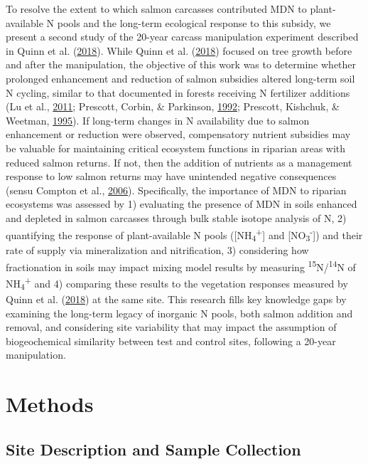 \documentclass [11pt, proquest] {uwthesis}[2015/03/03]
\begin{document}
To resolve the extent to which salmon carcasses contributed MDN to
plant-available N pools and the long-term ecological response to this
subsidy, we present a second study of the 20-year carcass manipulation
experiment described in Quinn et al.
(\protect\hyperlink{ref-Quinn2018}{2018}). While Quinn et al.
(\protect\hyperlink{ref-Quinn2018}{2018}) focused on tree growth before
and after the manipulation, the objective of this work was to determine
whether prolonged enhancement and reduction of salmon subsidies altered
long-term soil N cycling, similar to that documented in forests
receiving N fertilizer additions (Lu et al.,
\protect\hyperlink{ref-Lu2011}{2011}; Prescott, Corbin, \& Parkinson,
\protect\hyperlink{ref-Prescott1992}{1992}; Prescott, Kishchuk, \&
Weetman, \protect\hyperlink{ref-Prescott1995}{1995}). If long-term
changes in N availability due to salmon enhancement or reduction were
observed, compensatory nutrient subsidies may be valuable for
maintaining critical ecosystem functions in riparian areas with reduced
salmon returns. If not, then the addition of nutrients as a management
response to low salmon returns may have unintended negative consequences
(sensu Compton et al., \protect\hyperlink{ref-Compton2006}{2006}).
Specifically, the importance of MDN to riparian ecosystems was assessed
by 1) evaluating the presence of MDN in soils enhanced and depleted in
salmon carcasses through bulk stable isotope analysis of N, 2)
quantifying the response of plant-available N pools
({[}NH\textsubscript{4}\textsuperscript{+}{]} and
{[}NO\textsubscript{3}\textsuperscript{-}{]}) and their rate of supply
via mineralization and nitrification, 3) considering how fractionation
in soils may impact mixing model results by measuring
\textsuperscript{15}N/\textsuperscript{14}N of
NH\textsubscript{4}\textsuperscript{+} and 4) comparing these results to
the vegetation responses measured by Quinn et al.
(\protect\hyperlink{ref-Quinn2018}{2018}) at the same site. This
research fills key knowledge gaps by examining the long-term legacy of
inorganic N pools, both salmon addition and removal, and considering
site variability that may impact the assumption of biogeochemical
similarity between test and control sites, following a 20-year
manipulation.

\section{Methods}\label{methods}

\subsection{Site Description and Sample
Collection}\label{site-description-and-sample-collection}
\end{document}
